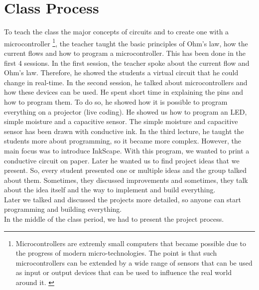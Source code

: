 \documentclass[doc.tex]{subfiles}
\begin{document}
    \section{Class Process}
    \begin{flushleft}
        To teach the class the major concepts of circuits and to create one with a microcontroller {\footnote{\label{foot:
        microcontroller} Microcontrollers are extremly small computers that became possible due to the progress of modern 
        micro-technologies. The point is that such microcontrollers can be extended by a wide range of sensors that can 
        be used as input or output devices that can be used to influence the real world around it. \cite{Schief1997, 
        Dembowski2014}}}, the teacher taught the basic principles of Ohm's law, how the current flows and how to program 
        a microcontroller. This has been done in the first 4 sessions.\newline
        In the first session, the teacher spoke about the current flow and Ohm's law. Therefore, he showed the students
        a virtual circuit that he could change in real-time.\newline
        In the second session, he talked about microcontrollers and how these devices can be used. He spent short
        time in explaining the pins and how to program them. To do so, he showed how it is possible to program
        everything on a projector (live coding). He showed us how to program an LED, simple moisture and 
        a capacitive sensor. The simple moisture and capacitive sensor has been drawn with conductive ink.\newline
        In the third lecture, he taught the students more about programming, so it became more complex. However, 
        the main focus was to introduce InkScape. With this program, we wanted to print a conductive circuit on paper.\newline
        Later he wanted us to find project ideas that we present. So, every student presented one or multiple ideas and
        the group talked about them. Sometimes, they discussed improvements and sometimes, they talk about the idea itself
        and the way to implement and build everything. \\
        Later we talked and discussed the projects more detailed, so anyone can start programming and building everything.\\
        In the middle of the class period, we had to present the project process.  
    \end{flushleft}
\end{document}
